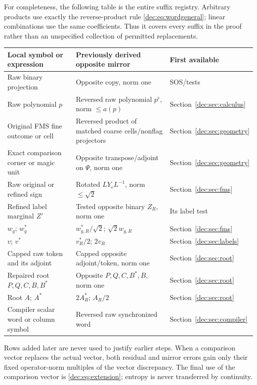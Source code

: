 For completeness, the following table is the entire suffix registry. Arbitrary products use exactly the reverse-product rule \eqref{dec:eq:wordgeneral}; linear combinations use the same coefficients. Thus it covers every suffix in the proof rather than an unspecified collection of permitted replacements.
\begin{center}
\small
\begin{tabular}{>{\raggedright\arraybackslash}p{44mm}>{\raggedright\arraybackslash}p{62mm}>{\raggedright\arraybackslash}p{29mm}}
\toprule
Local symbol or expression & Previously derived opposite mirror & First available\\
\midrule
Raw binary projection & Opposite copy, norm one & SOS/tests\\
Raw polynomial $p$ & Reversed raw polynomial $p^\flat$, norm $\le a(p)$ & Section~\ref{dec:sec:calculus}\\
Original FMS fine outcome or cell & Reversed product of matched coarse cells/nonflag projectors & Section~\ref{dec:sec:geometry}\\
Exact comparison corner or magic unit & Opposite transpose/adjoint on $\Psi$, norm one & Section~\ref{dec:sec:geometry}\\
Raw original or refined sign & Rotated $LY_cL^{-1}$, norm $\le\sqrt2$ & Section~\ref{dec:sec:fms}\\
Refined label marginal $Z'$ & Tested opposite binary $Z_R$, norm one & Its label test\\
$w_g$; $w_g^*$ & $w_{g,R}^*/\sqrt2$; $\sqrt2w_{g,R}$ & Section~\ref{dec:sec:fms}\\
$v$; $v^*$ & $v_R^*/2$; $2v_R$ & Section~\ref{dec:sec:labels}\\
Capped raw token and its adjoint & Capped opposite adjoint/token, norm one & Section~\ref{dec:sec:root}\\
Repaired root $P,Q,C,B,B^*$ & Opposite $P,Q,C,B^*,B$, norm one & Section~\ref{dec:sec:root}\\
Root $A$; $A^*$ & $2A_R^*$; $A_R/2$ & Section~\ref{dec:sec:root}\\
Compiler scalar word or column symbol & Reversed raw synchronized word & Section~\ref{dec:sec:compiler}\\
\bottomrule
\end{tabular}
\end{center}
Rows added later are never used to justify earlier steps. When a comparison vector replaces the actual vector, both residual and mirror errors gain only their fixed operator-norm multiples of the vector discrepancy. The final use of the comparison vector is \eqref{dec:eq:extension}; entropy is never transferred by continuity.

